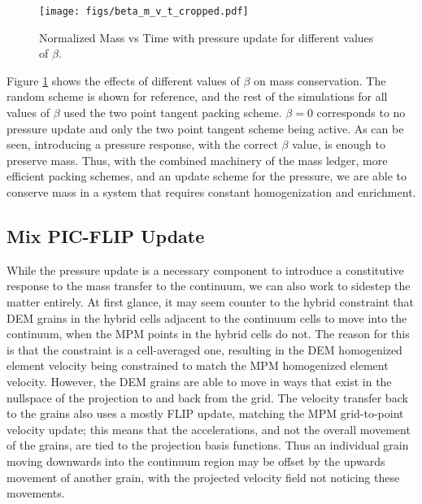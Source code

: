 \begin{figure}[htp] 
    \centering
    \texttt{[image: figs/beta\_m\_v\_t\_cropped.pdf]}
    \caption{Normalized Mass vs Time with pressure update for different values of $\beta$.}
    \label{beta_m_v_t}
\end{figure}

Figure \ref{beta_m_v_t} shows the effects of different values of $\beta$ on mass conservation. The random scheme is shown for reference, and the rest of the simulations for all values of $\beta$ used the two point tangent packing scheme. $\beta=0$ corresponds to no pressure update and only the two point tangent scheme being active. As can be seen, introducing a pressure response, with the correct $\beta$ value, is enough to preserve mass. Thus, with the combined machinery of the mass ledger, more efficient packing schemes, and an update scheme for the pressure, we are able to conserve mass in a system that requires constant homogenization and enrichment.

\subsection{Mix PIC-FLIP Update}
While the pressure update is a necessary component to introduce a constitutive response to the mass transfer to the continuum, we can also work to sidestep the matter entirely. At first glance, it may seem counter to the hybrid constraint that DEM grains in the hybrid cells adjacent to the continuum cells to move into the continuum, when the MPM points in the hybrid cells do not. The reason for this is that the constraint is a cell-averaged one, resulting in the DEM homogenized element velocity being constrained to match the MPM homogenized element velocity. However, the DEM grains are able to move in ways that exist in the nullspace of the projection to and back from the grid. The velocity transfer back to the grains also uses a mostly FLIP update, matching the MPM grid-to-point velocity update; this means that the accelerations, and not the overall movement of the grains, are tied to the projection basis functions. Thus an individual grain moving downwards into the continuum region may be offset by the upwards movement of another grain, with the projected velocity field not noticing these movements. 

